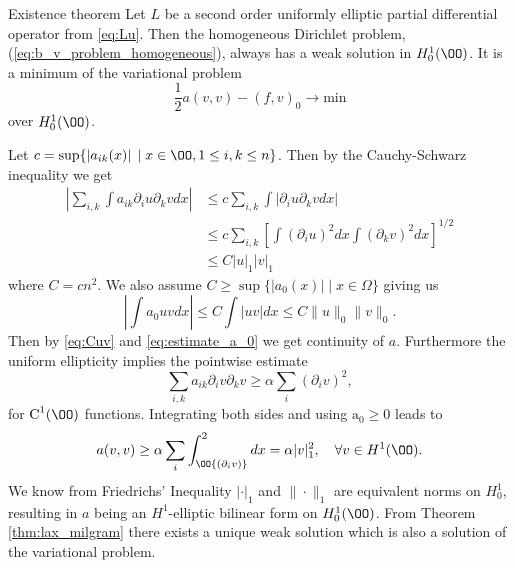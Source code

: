 \begin{thmx}{Existence theorem}
    Let $L$ be a second order uniformly elliptic partial differential operator from \eqref{eq:Lu}. Then the homogeneous Dirichlet problem,
     (\ref{eq:b_v_problem_homogeneous}), always has a weak solution in $H_0^1(\OO)$. It is a minimum of the variational problem
    \begin{equation}
        \frac{1}{2} a(v,v) - {(f, v)}_0 \rightarrow \text{min}
    \end{equation}
    over $H_0^1(\OO)$.
\label{thm:existence_hom_dirichlet}
\end{thmx}

\begin{bev}
    Let $c = \sup\{\left| a_{ik}(x) \right| \; | \; x \in \OO, 1 \leq i,k \leq n\}$. Then by the Cauchy-Schwarz inequality we get
    \begin{align}
        \left| \sum_{i,k} \int a_{ik} \partial_i u \partial_k v dx \right| &\leq c \sum_{i,k} \int  \left|  \partial_i u \partial_k v dx\right|\\
        &\leq c \sum_{i,k} {\left[ \int {\left( \partial_i u \right)}^2 dx \int {\left( \partial_k v \right)}^2 dx  \right]}^{1/2} \\
        &\leq C {\left| u \right|}_1 {\left| v \right|}_1 \label{eq:Cuv}
    \end{align}
    where $C=cn^2$. 
    We also assume $C\geq \sup\{|a_0(x)| \; | \; x\in \Omega\}$ giving us
    \begin{equation}
        \left|\int a_0 u v dx \right| \leq C \int |u v| dx \leq C \|u\|_0 \|v\|_0.  
        \label{eq:estimate_a_0}   
    \end{equation}
    Then by \eqref{eq:Cuv} and \eqref{eq:estimate_a_0} we get continuity of $a$.
    Furthermore the uniform ellipticity implies the pointwise estimate %
    \[
        \sum_{i,k} a_{ik} \partial_i v \partial_k v \geq \alpha \sum_i {\left( \partial_i v \right)}^2,
    \]
    for $\text{C}^1(\OO)$ functions. Integrating both sides and using $\text{a}_0 \geq 0$ leads to %
    \begin{equation}
        a(v,v) \geq \alpha \sum_i \int_\OO {\left(\partial_i v\right)}^2 dx = \alpha |v|^2_1, \quad \forall v \in H^1(\OO).
    \end{equation}
    We know from Friedrichs' Inequality $|\cdot|_1$ and $\| \cdot \|_1$ are equivalent norms on $H_0^1$,
     resulting in $a$ being an $H^1$-elliptic bilinear form on $H_0^1(\OO)$.
    From Theorem \ref{thm:lax_milgram} there exists a unique weak solution which is also a solution of the variational problem.
\end{bev}